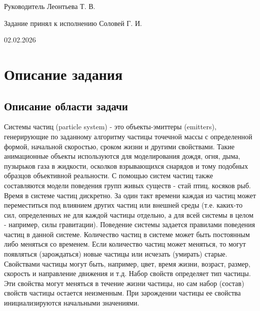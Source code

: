 \documentclass[a4paper,12pt]{article}
\newcommand{\StudentName}{Соловей Г. И.}
\newcommand{\SupervisorName}{Леонтьева Т. В.}
\newcommand{\StartDate}{02.02.2026}
\begin{document}
\vspace{1cm}

\noindent
Руководитель \hfill \SupervisorName

\vspace{1cm}

\noindent
Задание принял к исполнению \hfill \StudentName

\vspace{1cm}

\hfill \StartDate

\thispagestyle{empty}

\newpage

\tableofcontents
\setcounter{page}{1}
\thispagestyle{empty}

\newpage

\section{Описание задания}
\subsection{Описание области задачи}

Системы частиц (particle system) - это объекты-эмиттеры (emitters), генерирующие по
заданному алгоритму частицы точечной массы с определенной формой, начальной
скоростью, сроком жизни и другими свойствами.
Такие анимационные объекты используются для моделирования дождя, огня, дыма,
пузырьков газа в жидкости, осколков взрывающихся снарядов и тому подобных образцов
объективной реальности. С помощью систем частиц также составляются модели
поведения групп живых существ - стай птиц, косяков рыб.
Время в системе частиц дискретно. За один такт времени каждая из частиц может
переместиться под влиянием других частиц или внешней среды (т.е. каких-то сил,
определенных не для каждой частицы отдельно, а для всей системы в целом - например,
силы гравитации). Поведение системы задается правилами поведения частиц в данной
системе.
Количество частиц в системе может быть постоянным либо меняться со временем.
Если количество частиц может меняться, то могут появляться (зарождаться) новые
частицы или исчезать (умирать) старые.
Свойствами частицы могут быть, например, цвет, время жизни, возраст, размер,
скорость и направление движения и т.д. Набор свойств определяет тип частицы. Эти
свойства могут меняться в течение жизни частицы, но сам набор (состав) свойств частицы
остается неизменным. При зарождении частицы ее свойства инициализируются
начальными значениями.
\end{document}
